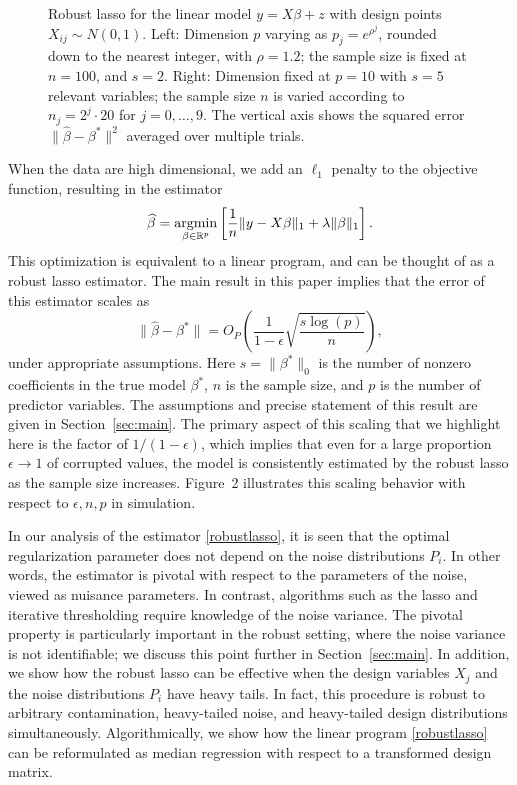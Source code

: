 \begin{figure}[t]
\begin{center}
\begin{tabular}{cc}
    \end{tabular}
  \end{center}
\caption{Robust lasso for the linear model  $y=X\beta + z$ with design points $X_{ij}\sim N(0,1)$.
Left: Dimension $p$ varying as $p_{j} = e^{\rho^j}$, rounded down to the nearest integer, with $\rho=1.2$; the sample size is fixed at $n=100$, and $s=2$. Right: Dimension fixed at $p=10$ with $s=5$ relevant variables; the sample size $n$ is varied according to
$n_j = 2^j \cdot 20$ for $j=0,\ldots, 9$. The vertical axis shows the squared error $\|\hat \beta - \beta^*\|^2$ averaged over multiple trials.}
\end{figure}

When the data are high dimensional, we add an $\ell_1$ penalty to the objective function, resulting in the estimator
\begin{equation}
  \wh{\beta}=\argmin_{\beta\in\mathbb{R}^p}\left[\frac{1}{n}\|y-X\beta\|_1+\lambda\|\beta\|_1\right].
  \label{robustlasso}
\end{equation}
This optimization is equivalent to a linear program, and can be thought of as a robust lasso estimator. The main result in this paper implies that the error of this estimator scales as
\begin{equation}
  \|\hat \beta - \beta^*\|  = O_P\left(\frac{1}{1-\epsilon} \sqrt{\frac{s\log(p)}{n}}\right),
\end{equation}
under appropriate assumptions.
Here $s = \|\beta^*\|_0$ is the number of nonzero coefficients in the true model $\beta^*$, $n$ is the sample size, and $p$ is the number of predictor variables. The assumptions and precise statement of this result are given in Section~\ref{sec:main}. The primary aspect of this scaling that we highlight here is the factor of $1/(1-\epsilon)$, which implies that even for a large proportion $\epsilon \to 1$ of corrupted values, the model is consistently estimated by the robust lasso as the sample size increases. Figure~2 illustrates this scaling behavior with respect to $\epsilon, n, p$ in simulation.

In our analysis of the estimator \eqref{robustlasso}, it is seen that the optimal regularization parameter does not depend on the noise distributions $P_i$. In other words, the
estimator is pivotal with respect to the parameters of the noise, viewed as nuisance parameters.
In contrast, algorithms such as the lasso \citep{bickel2009simultaneous} and iterative thresholding \citep{suggala2019adaptive} require knowledge of the noise variance.
The pivotal property is particularly important in the robust setting, where the
noise variance is not identifiable; we discuss this point further in Section~\ref{sec:main}.
In addition, we show how the robust lasso can be effective when the design variables $X_j$ and the noise distributions $P_i$ have heavy tails.
In fact, this procedure is robust to arbitrary contamination, heavy-tailed noise, and heavy-tailed design distributions simultaneously. Algorithmically, we show how the linear program \eqref{robustlasso} can be reformulated as median regression with respect to a transformed design matrix.

